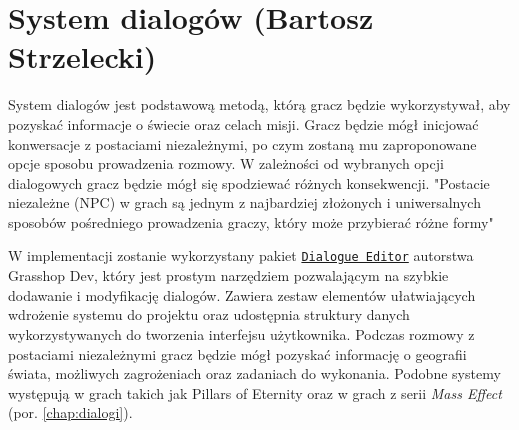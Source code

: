 \section{System dialogów (Bartosz Strzelecki)}\label{s:dial_proj}
System dialogów jest podstawową metodą, którą gracz będzie wykorzystywał, aby pozyskać informacje  o świecie oraz celach misji.
Gracz będzie mógł inicjować konwersacje z postaciami niezależnymi, po czym zostaną mu zaproponowane opcje sposobu prowadzenia rozmowy.
W zależności od wybranych opcji dialogowych gracz będzie mógł się spodziewać różnych konsekwencji.
"Postacie niezależne (NPC) w grach są jednym z najbardziej złożonych i uniwersalnych sposobów pośredniego prowadzenia graczy, który może przybierać różne formy" \cite{projektowanie_gier}

W implementacji zostanie wykorzystany pakiet
\href{https://assetstore.unity.com/packages/tools/utilities/dialogue-editor-168329}{\texttt{Dialogue Editor}} autorstwa Grasshop Dev, który jest prostym narzędziem pozwalającym na szybkie dodawanie i modyfikację dialogów.
Zawiera zestaw elementów ułatwiających wdrożenie systemu do projektu oraz udostępnia struktury danych wykorzystywanych do tworzenia interfejsu użytkownika.
Podczas rozmowy z postaciami niezależnymi gracz będzie mógł pozyskać informację o geografii świata, możliwych zagrożeniach oraz zadaniach do wykonania. 
Podobne systemy występują w grach takich jak Pillars of Eternity oraz w grach z serii \textit{Mass Effect} (por. \ref{chap:dialogi}).

